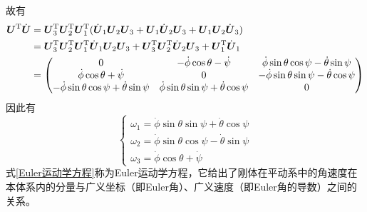 故有
\begin{align*}
	\boldsymbol{U}^{\mathrm{T}} \dot{\boldsymbol{U}} & = \boldsymbol{U}_3^{\mathrm{T}} \boldsymbol{U}_2^{\mathrm{T}} \boldsymbol{U}_1^{\mathrm{T}} (\dot{\boldsymbol{U}}_1 \boldsymbol{U}_2 \boldsymbol{U}_3 + \boldsymbol{U}_1 \dot{\boldsymbol{U}}_2 \boldsymbol{U}_3 + \boldsymbol{U}_1 \boldsymbol{U}_2 \dot{\boldsymbol{U}}_3) \\
	& = \boldsymbol{U}_3^{\mathrm{T}} \boldsymbol{U}_2^{\mathrm{T}} \boldsymbol{U}_1^{\mathrm{T}} \dot{\boldsymbol{U}}_1 \boldsymbol{U}_2 \boldsymbol{U}_3 + \boldsymbol{U}_3^{\mathrm{T}} \boldsymbol{U}_2^{\mathrm{T}} \dot{\boldsymbol{U}}_2 \boldsymbol{U}_3 + \boldsymbol{U}_1^{\mathrm{T}} \dot{\boldsymbol{U}}_1 \\
	& = \begin{pmatrix}
		0 & -\dot{\phi} \cos \theta - \dot{\psi} & \dot{\phi} \sin \theta \cos \psi - \dot{\theta} \sin \psi \\
		\dot{\phi} \cos \theta + \dot{\psi} & 0 & -\dot{\phi} \sin \theta \sin \psi - \dot{\theta} \cos \psi \\
		- \dot{\phi} \sin \theta \cos \psi + \dot{\theta} \sin \psi & \dot{\phi} \sin \theta \sin \psi + \dot{\theta} \cos \psi & 0
	\end{pmatrix}
\end{align*}
因此有
\begin{equation}
	\begin{cases}
		\omega_1 = \dot{\phi} \sin \theta \sin \psi + \dot{\theta} \cos \psi \\
		\omega_2 = \dot{\phi} \sin \theta \cos \psi - \dot{\theta} \sin \psi \\
		\omega_3 = \dot{\phi} \cos \theta + \dot{\psi}
	\end{cases}
	\label{Euler运动学方程}
\end{equation}
式\eqref{Euler运动学方程}称为{\heiti Euler运动学方程}，它给出了刚体在平动系中的角速度在本体系内的分量与广义坐标（即Euler角）、广义速度（即Euler角的导数）之间的关系。

